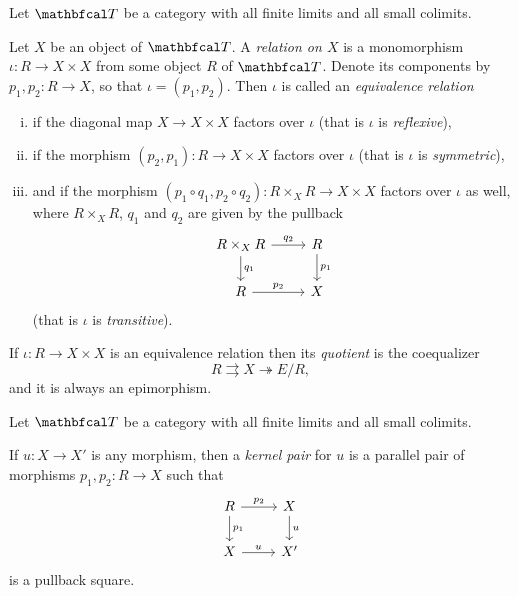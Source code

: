 \begin{definition}
	Let $\category T$ be a category with all finite limits and all small colimits.
	
	Let $X$ be an object of $\category T$. A \emph{relation on $X$} is a monomorphism $\iota\colon R\to X\times X$ from some object $R$ of $\category T$. Denote its components by $p_1, p_2\colon R\to X$, so that $\iota=(p_1, p_2)$. Then $\iota$ is called an \emph{equivalence relation}
	\begin{enumerate}[(i)]
		\item
		if the diagonal map $X\to X\times X$ factors over $\iota$ (that is $\iota$ is \emph{reflexive}),
		
		\item
		if the morphism $(p_2, p_1)\colon R\to X\times X$ factors over $\iota$ (that is $\iota$ is \emph{symmetric}),
		
		\item 
		and if the morphism $(p_1\circ q_1, p_2\circ q_2)\colon R\times_X R \to X\times X$ factors over $\iota$ as well, where $R\times_X R$, $q_1$ and $q_2$ are given by the pullback
			$$\begin{tikzcd}
				R\times_X R\ar[r, "q_2"]\ar[d, "q_1"] &R \ar[d, "p_1"]\\
				R \ar[r, "p_2"] &X
			\end{tikzcd}$$
		(that is $\iota$ is \emph{transitive}).
	\end{enumerate}
	If $\iota\colon R\to X\times X$ is an equivalence relation then its \emph{quotient} is the coequalizer
		$$R\rightrightarrows X\twoheadrightarrow E/R,$$
	and it is always an epimorphism.
\end{definition}

\begin{definition}
	Let $\category T$ be a category with all finite limits and all small colimits.
	
	If $u\colon X\to X'$ is any morphism, then a \emph{kernel pair} for $u$ is a parallel pair of morphisms $p_1, p_2\colon R\to X$ such that
		$$\begin{tikzcd}
			R\ar[r, "p_2"]\ar[d, "p_1"] &X\ar[d, "u"]\\
			X\ar[r, "u"] &X'
		\end{tikzcd}$$
	is a pullback square.
\end{definition}

